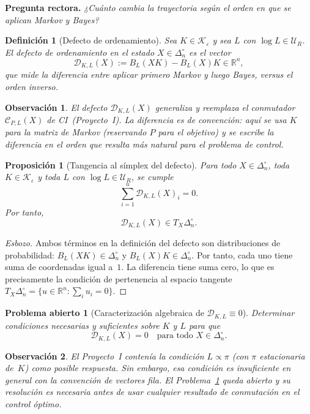 \documentclass[12pt]{article}
\newtheorem{definicion}{Definición}[section]
\newtheorem{proposicion}{Proposición}[section]
\newtheorem{observacion}{Observación}[section]
\newtheorem{problema}{Problema abierto}[section]
\begin{document}
\noindent\textbf{Pregunta rectora.} \textit{¿Cuánto cambia la trayectoria según
el orden en que se aplican Markov y Bayes?}

\bigskip

\begin{definicion}[Defecto de ordenamiento]
\label{def:defecto}
Sea $K\in\mathcal{K}_\varepsilon$ y sea $L$ con $\log L\in\mathcal{U}_R$. El
\emph{defecto de ordenamiento} en el estado $X\in\Delta_n^\circ$ es el vector
\[
\mathcal{D}_{K,L}(X)
:=
B_L(XK)-B_L(X)K
\in\mathbb{R}^n,
\]
que mide la diferencia entre aplicar primero Markov y luego Bayes, versus el
orden inverso.
\end{definicion}

\begin{observacion}
El defecto $\mathcal{D}_{K,L}(X)$ generaliza y reemplaza el conmutador
$\mathcal{C}_{P,L}(X)$ de CI~(Proyecto~I). La diferencia es de convención: aquí
se usa $K$ para la matriz de Markov (reservando $P$ para el objetivo) y se
escribe la diferencia en el orden que resulta más natural para el problema de
control.
\end{observacion}

\begin{proposicion}[Tangencia al símplex del defecto]
\label{prop:tangencia}
Para todo $X\in\Delta_n^\circ$, toda $K\in\mathcal{K}_\varepsilon$ y toda $L$
con $\log L\in\mathcal{U}_R$, se cumple
\[
\sum_{i=1}^n \mathcal{D}_{K,L}(X)_i=0.
\]
Por tanto,
\[
\mathcal{D}_{K,L}(X)\in T_X\Delta_n^\circ.
\]
\end{proposicion}

\begin{proof}[Esbozo]
Ambos términos en la definición del defecto son distribuciones de probabilidad:
$B_L(XK)\in\Delta_n^\circ$ y $B_L(X)K\in\Delta_n^\circ$. Por tanto, cada
uno tiene suma de coordenadas igual a~$1$. La diferencia tiene suma cero, lo
que es precisamente la condición de pertenencia al espacio tangente
$T_X\Delta_n^\circ=\{u\in\mathbb{R}^n:\sum_i u_i=0\}$.
\end{proof}

\begin{problema}[Caracterización algebraica de $\mathcal{D}_{K,L}\equiv 0$]
\label{prob:conmutacion}
Determinar condiciones necesarias y suficientes sobre $K$ y $L$ para que
\[
\mathcal{D}_{K,L}(X)=0
\quad\text{para todo }X\in\Delta_n^\circ.
\]
\end{problema}

\begin{observacion}
El Proyecto~I contenía la condición $L\propto\pi$ (con $\pi$ estacionaria de~$K$)
como posible respuesta. Sin embargo, esa condición es insuficiente en general con
la convención de vectores fila. El Problema~\ref{prob:conmutacion} queda abierto
y su resolución es necesaria antes de usar cualquier resultado de conmutación
en el control óptimo.
\end{observacion}
\end{document}
